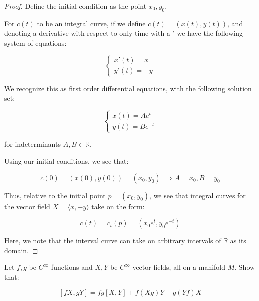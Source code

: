 \documentclass[10pt]{article}
\newenvironment{problem}[2][]{\begin{trivlist}
\item[\hskip \labelsep {\bfseries #1}\hskip \labelsep {\bfseries #2.}]}{\end{trivlist}}
\begin{document}
\begin{proof}

Define the initial condition as the point $x_0, y_0$.

For $c(t)$ to be an integral curve, if we define $c(t) = (x(t), y(t))$, and denoting a derivative with respect to only time with a $'$ we have the following system of equations:

$$\begin{cases} x'(t) = x \\ y'(t) = -y \end{cases}$$

We recognize this as first order differential equations, with the following solution set:

$$ \begin{cases} x(t) = Ae^{t} \\ y(t) = Be^{-t} \end{cases} $$

for indeterminants $A, B \in \mathbb{R}$.

Using our initial conditions, we see that:

$$c(0) = (x(0), y(0)) = (x_0, y_0) \implies A = x_0, B = y_0$$

Thus, relative to the initial point $p = (x_0, y_0)$, we see that integral curves for the vector field $X = \langle x, -y \rangle$ take on the form:

$$ c(t) = c_t(p) = (x_0 e^{t}, y_0 e^{-t}) $$

Here, we note that the interval curve can take on arbitrary intervals of $\mathbb{R}$ as its domain.

\end{proof}

\begin{problem}{Question 6}

Let $f, g$ be $C^\infty$ functions and $X, Y$ be $C^\infty$ vector fields, all on a manifold $M$. Show that:

$$ [fX, gY] = fg[X,Y] + f(Xg)Y - g(Yf)X$$

\end{problem}
\end{document}
